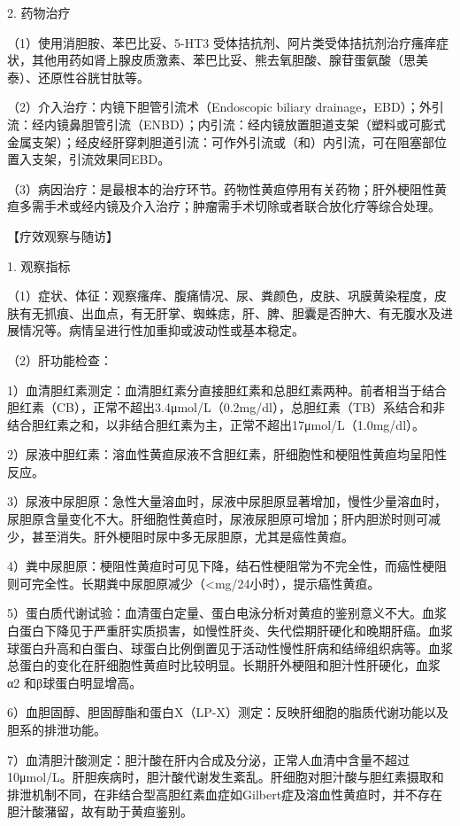 2. 药物治疗

（1）使用消胆胺、苯巴比妥、5-HT{3}
受体拮抗剂、阿片类受体拮抗剂治疗瘙痒症状，其他用药如肾上腺皮质激素、苯巴比妥、熊去氧胆酸、腺苷蛋氨酸（思美泰）、还原性谷胱甘肽等。

（2）介入治疗：内镜下胆管引流术（Endoscopic biliary
drainage，EBD）；外引流：经内镜鼻胆管引流（ENBD）；内引流：经内镜放置胆道支架（塑料或可膨式金属支架）；经皮经肝穿刺胆道引流：可作外引流或（和）内引流，可在阻塞部位置入支架，引流效果同EBD。

（3）病因治疗：是最根本的治疗环节。药物性黄疸停用有关药物；肝外梗阻性黄疸多需手术或经内镜及介入治疗；肿瘤需手术切除或者联合放化疗等综合处理。

【疗效观察与随访】

1. 观察指标

（1）症状、体征：观察瘙痒、腹痛情况、尿、粪颜色，皮肤、巩膜黄染程度，皮肤有无抓痕、出血点，有无肝掌、蜘蛛痣，肝、脾、胆囊是否肿大、有无腹水及进展情况等。病情呈进行性加重抑或波动性或基本稳定。

（2）肝功能检查：

1）血清胆红素测定：血清胆红素分直接胆红素和总胆红素两种。前者相当于结合胆红素（CB），正常不超出3.4μmol/L（0.2mg/dl），总胆红素（TB）系结合和非结合胆红素之和，以非结合胆红素为主，正常不超出17μmol/L（1.0mg/dl）。

2）尿液中胆红素：溶血性黄疸尿液不含胆红素，肝细胞性和梗阻性黄疸均呈阳性反应。

3）尿液中尿胆原：急性大量溶血时，尿液中尿胆原显著增加，慢性少量溶血时，尿胆原含量变化不大。肝细胞性黄疸时，尿液尿胆原可增加；肝内胆淤时则可减少，甚至消失。肝外梗阻时尿中多无尿胆原，尤其是癌性黄疸。

4）粪中尿胆原：梗阻性黄疸时可见下降，结石性梗阻常为不完全性，而癌性梗阻则可完全性。长期粪中尿胆原减少（\textless{}mg/24小时），提示癌性黄疸。

5）蛋白质代谢试验：血清蛋白定量、蛋白电泳分析对黄疸的鉴别意义不大。血浆白蛋白下降见于严重肝实质损害，如慢性肝炎、失代偿期肝硬化和晚期肝癌。血浆球蛋白升高和白蛋白、球蛋白比例倒置见于活动性慢性肝病和结缔组织病等。血浆总蛋白的变化在肝细胞性黄疸时比较明显。长期肝外梗阻和胆汁性肝硬化，血浆α{2}
和β球蛋白明显增高。

6）血胆固醇、胆固醇酯和蛋白X（LP-X）测定：反映肝细胞的脂质代谢功能以及胆系的排泄功能。

7）血清胆汁酸测定：胆汁酸在肝内合成及分泌，正常人血清中含量不超过10μmol/L。肝胆疾病时，胆汁酸代谢发生紊乱。肝细胞对胆汁酸与胆红素摄取和排泄机制不同，在非结合型高胆红素血症如Gilbert症及溶血性黄疸时，并不存在胆汁酸潴留，故有助于黄疸鉴别。

